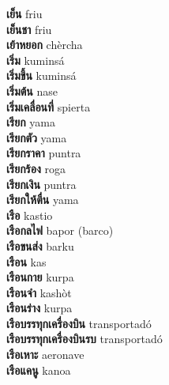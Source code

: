 \textbf{ เย็น  } friu \\
\textbf{ เย็นชา  } friu \\
\textbf{ เย้าหยอก  } chèrcha \\
\textbf{ เริ่ม  } kuminsá \\
\textbf{ เริ่มขึ้น  } kuminsá \\
\textbf{ เริ่มต้น  } nase \\
\textbf{ เริ่มเคลื่อนที่  } spierta \\
\textbf{ เรียก  } yama \\
\textbf{ เรียกตัว  } yama \\
\textbf{ เรียกราคา  } puntra \\
\textbf{ เรียกร้อง  } roga \\
\textbf{ เรียกเงิน  } puntra \\
\textbf{ เรียกให้ตื่น  } yama \\
\textbf{ เรือ  } kastio \\
\textbf{ เรือกลไฟ  } bapor (barco) \\
\textbf{ เรือขนส่ง  } barku \\
\textbf{ เรือน  } kas \\
\textbf{ เรือนกาย  } kurpa \\
\textbf{ เรือนจำ  } kashòt \\
\textbf{ เรือนร่าง  } kurpa \\
\textbf{ เรือบรรทุกเครื่องบิน  } transportadó \\
\textbf{ เรือบรรทุกเครื่องบินรบ  } transportadó \\
\textbf{ เรือเหาะ  } aeronave \\
\textbf{ เรือแคนู  } kanoa \\
